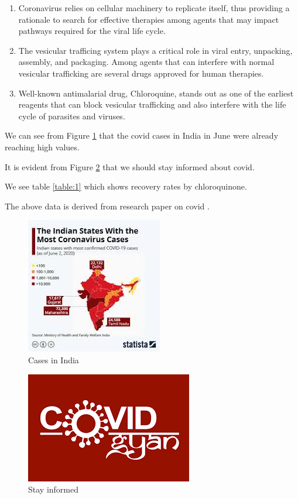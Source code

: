\documentclass{article}
\begin{document}
\begin{enumerate} %
    \item Coronavirus relies on cellular machinery to replicate itself, thus providing a rationale to search for effective therapies among agents that may impact pathways required for the viral life cycle.
    \item The vesicular trafficing system plays a critical role in viral entry, unpacking, assembly, and packaging. Among agents that can interfere with normal vesicular trafficking are several drugs approved for human therapies.
    \item Well-known antimalarial drug, Chloroquine, stands out as one of the earliest reagents that can block vesicular trafficking and also interfere with the life cycle of parasites and viruses.
\end{enumerate}
We can see from Figure \ref{fig:indiamap} that the covid cases in India in June were already reaching high values.

It is evident from Figure \ref{fig:covidgyan} that we should stay informed about covid.

We see table \ref{table:1} which shows recovery rates by chloroquinone.

\raggedright The above data is derived from research paper on covid \cite{huang2020treating}.

\newpage
\begin{figure} %
    \centering
    \includegraphics[]{c19.jpg}
    \caption{Cases in India}
    \label{fig:indiamap}
\end{figure}

\begin{figure}
    \centering
    \includegraphics[scale=0.2]{cov.png}
    \caption{Stay informed}
    \label{fig:covidgyan}
\end{figure}
\end{document}
